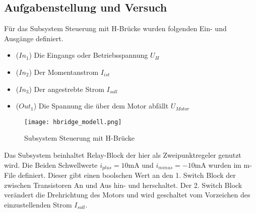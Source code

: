 \subsection{Aufgabenstellung und Versuch}

Für das Subsystem Steuerung mit H-Brücke wurden folgenden Ein- und Ausgänge
definiert.\\

\begin{itemize}
    \item ($In_1$) Die Eingangs oder Betriebsspannung $U_H$
    \item ($In_2$) Der Momentanstrom $I_{ist}$
    \item ($In_3$) Der angestrebte Strom $I_{soll}$
    \item ($Out_1$) Die Spannung die über dem Motor abfällt $U_{Motor}$
\end{itemize}


\begin{figure}[H]
    \centering
    \texttt{[image: hbridge\_modell.png]}
    \caption{Subsystem Steuerung mit H-Brücke}
    \label{fig:Subsystem H-Bridge}
\end{figure}

Das Subsystem beinhaltet Relay-Block der hier als Zweipunktregeler genutzt
wird. Die Beiden Schwellwerte $i_{plus}=10\mathrm{mA}$ und $i_{minus}=-10
\mathrm{mA}$ wurden im m-File definiert. Dieser gibt einen boolschen Wert
an den 1. Switch Block der zwischen Transistoren An und Aus hin- und
herschaltet. Der 2. Switch Block verändert die Drehrichtung des Motors und
wird geschaltet vom Vorzeichen des einzustellenden Strom $I_{soll}$.